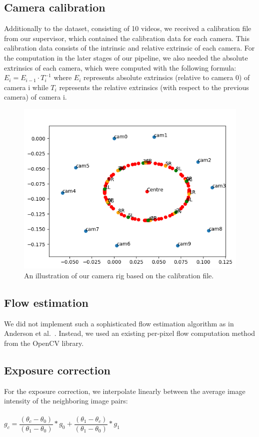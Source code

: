 \documentclass[10pt,twocolumn,letterpaper]{article}
\begin{document}
\subsection{Camera calibration}
Additionally to the dataset, consisting of 10 videos, we received a calibration file from our supervisor, which contained the calibration data for each camera. This calibration data consists of the intrinsic and relative extrinsic of each camera. For the computation in the later stages of our pipeline, we also needed the absolute extrinsics of each camera, which were computed with the following formula:
$E_i= E_{i-1} \cdot T_i^{-1}$ where $E_i$ represents absolute extrinsics (relative to camera 0) of camera i while $T_i$ represents the relative extrinsics (with respect to the previous camera) of camera i.

\begin{figure}[t]
\begin{center}
   \includegraphics[width=0.8\linewidth]{pictures/our_camera_rig.PNG}
\end{center}
   \caption{An illustration of our camera rig based on the calibration file.}
\label{rig}
\end{figure}

\subsection{Flow estimation}
We did not implement such a sophisticated flow estimation algorithm as in Anderson et al.~\cite{jump16}. Instead, we used an existing per-pixel flow computation method from the OpenCV library.

\subsection{Exposure correction}
For the exposure correction, we interpolate linearly between the average image intensity of the neighboring image pairs:\\
\\
$g_{c}=\dfrac{(\theta_{c}-\theta_{0})}{(\theta_1-\theta_{0})}*g_{0} + \dfrac{(\theta_{1}-\theta_{c})}{(\theta_1-\theta_{0})}*g_{1}$
\\
\end{document}
